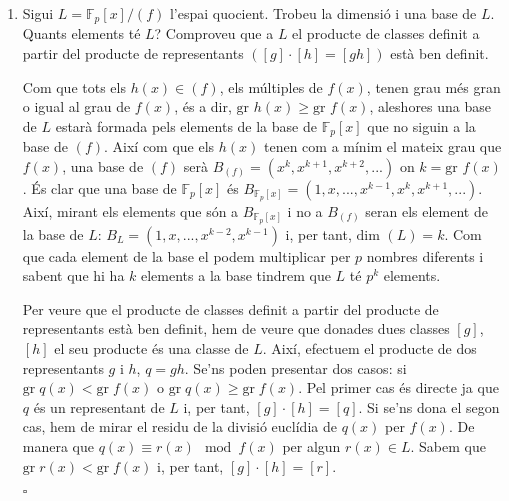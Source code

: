 \documentclass[11pt,a4paper]{article}
\newcommand*{\QED}{\hfill\ensuremath{\square}}
\begin{document}
\begin{enumerate}
\begin{enumerate}
\begin{itemize}
        \end{itemize}
        \item Sigui $L=\mathbb{F}_p[x]/(f)$ l'espai quocient. Trobeu la dimensió i una base de $L$. Quants elements té $L$? Comproveu que a $L$ el producte de classes definit a partir del producte de representants $([g]\cdot[h]=[gh])$ està ben definit.\par
        Com que tots els $h(x)\in (f)$, els múltiples de $f(x)$, tenen grau més gran o igual al grau de $f(x)$, és a dir, $\text{gr }h(x)\geq \text{gr }f(x)$, aleshores una base de $L$ estarà formada pels elements de la base de $\mathbb{F}_p[x]$ que no siguin a la base de $(f)$. Així com que els $h(x)$ tenen com a mínim el mateix grau que $f(x)$, una base de $(f)$ serà $B_{(f)}=(x^k,x^{k+1},x^{k+2},...)$ on $k=\text{gr }f(x)$. És clar que una base de $\mathbb{F}_p[x]$ és $B_{\mathbb{F}_p[x]}=(1,x,...,x^{k-1},x^k,x^{k+1},...)$. Així, mirant els elements que són a $B_{\mathbb{F}_p[x]}$ i no a $B_{(f)}$ seran els element de la base de $L$: $B_L=(1,x,...,x^{k-2},x^{k-1})$ i, per tant, $\text{dim }(L)=k$. Com que cada element de la base el podem multiplicar per $p$ nombres diferents i sabent que hi ha $k$ elements a la base tindrem que $L$ té $p^k$ elements.\par Per veure que el producte de classes definit a partir del producte de representants està ben definit, hem de veure que donades dues classes $[g]$, $[h]$ el seu producte és una classe de $L$. Així, efectuem el producte de dos representants $g$ i $h$, $q=gh$. Se'ns poden presentar dos casos: si $\text{gr}\;q(x)< \text{gr}\;f(x)$ o $\text{gr}\;q(x)\geq \text{gr}\;f(x)$. Pel primer cas és directe ja que $q$ és un representant de $L$ i, per tant, $[g]\cdot[h]=[q]$. Si se'ns dona el segon cas, hem de mirar el residu de la divisió euclídia de $q(x)$ per $f(x)$. De manera que $q(x)\equiv r(x)\mod f(x)$ per algun $r(x)\in L$. Sabem que $\text{gr}\;r(x)<\text{gr}\;f(x)$ i, per tant, $[g]\cdot[h]=[r]$.\par\QED
        

\end{enumerate}
\end{enumerate}
\end{document}
